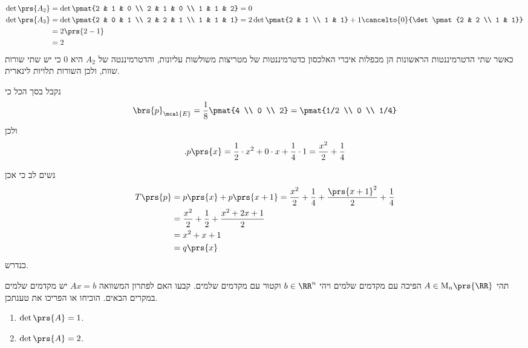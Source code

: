 \documentclass[a4paper,10pt,twoside,openany]{book}
\renewcommand{\Mat}{\mathrm{M}}
\begin{document}
\begin{solution}
\begin{align*}
\det\prs{A_2} &= \det\pmat{2 & 1 & 0 \\ 2 & 1 & 0 \\ 1 & 1 & 2} = 0 \\
\det\prs{A_3} &= \det\pmat{2 & 0 & 1 \\ 2 & 2 & 1 \\ 1 & 1 & 1} = 2 \det\pmat{2 & 1 \\ 1 & 1} + 1 \cancelto{0}{\det\pmat{2 & 2 \\ 1 & 1}}
\\&= 2 \prs{2 - 1}
\\&= 2
\end{align*}
כאשר שתי הדטרמיננטות הראשונות הן מכפלות איברי האלכסון כדטרמיננטות של מטריצות משולשות עליונות, והדטרמיננטה של
$A_2$
היא
$0$
כי יש שתי שורות שוות, ולכן השורות תלויות לינארית.

נקבל בסך הכל כי
\[ \brs{p}_{\mcal{E}} = \frac{1}{8} \pmat{4 \\ 0 \\ 2} = \pmat{1/2 \\ 0 \\ 1/4} \]
ולכן
\begin{align*}
\text{.} p\prs{x} = \frac{1}{2} \cdot x^2 + 0 \cdot x + \frac{1}{4} \cdot 1 = \frac{x^2}{2} + \frac{1}{4}
\end{align*}

נשים לב כי אכן
\begin{align*}
T\prs{p} &= p\prs{x} + p\prs{x+1} = \frac{x^2}{2} + \frac{1}{4} + \frac{\prs{x+1}^2}{2} + \frac{1}{4}
\\&= \frac{x^2}{2} + \frac{1}{2} + \frac{x^2 + 2x + 1}{2}
\\&= x^2 + x + 1
\\&= q\prs{x}
\end{align*}
כנדרש.
\end{solution}

\begin{exercisechap}
תהי
$A \in \Mat_n\prs{\RR}$
הפיכה עם מקדמים שלמים
ויהי
$b \in \RR^n$
וקטור עם מקדמים שלמים.
קבעו האם לפתרון המשוואה
$Ax = b$
יש מקדמים שלמים במקרים הבאים. הוכיחו או הפריכו את טענתכן.

\begin{enumerate}
\item $\det\prs{A} = 1$.
\item $\det\prs{A} = 2$.
\end{enumerate}
\end{exercisechap}
\end{document}
